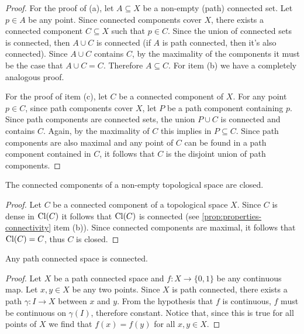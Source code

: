 \begin{proof}
    For the proof of (a), let \(A \subseteq X\) be a non-empty (path) connected
    set. Let \(p \in A\) be any point. Since connected components cover \(X\), there
    exists a connected component \(C \subseteq X\) such that \(p \in C\). Since the
    union of connected sets is connected, then \(A \cup C\) is connected (if \(A\)
    is path connected, then it's also connected). Since \(A \cup C\) contains \(C\),
    by the maximality of the components it must be the case that \(A \cup C =
    C\). Therefore \(A \subseteq C\). For item (b) we have a completely analogous
    proof.

    For the proof of item (c), let \(C\) be a connected component of \(X\). For any
    point \(p \in C\), since path components cover \(X\), let \(P\) be a path
    component containing \(p\). Since path components are connected sets, the union
    \(P \cup C\) is connected and contains \(C\). Again, by the maximality of \(C\)
    this implies in \(P \subseteq C\). Since path components are also maximal and
    any point of \(C\) can be found in a path component contained in \(C\), it
    follows that \(C\) is the disjoint union of path components.
\end{proof}

\begin{lemma}
    \label{lem:conn-comp-are-closed}
    The connected components of a non-empty topological space are closed.
\end{lemma}

\begin{proof}
    Let \(C\) be a connected component of a topological space \(X\). Since \(C\) is
    dense in \(\operatorname{Cl}(C)\) it follows that \(\operatorname{Cl}(C)\) is connected (see
    \cref{prop:properties-connectivity} item (b)). Since connected components are
    maximal, it follows that \(\operatorname{Cl}(C) = C\), thus \(C\) is closed.
\end{proof}

\begin{proposition}
    \label{prop:path-connected-is-connected}
    Any path connected space is connected.
\end{proposition}

\begin{proof}
    Let \(X\) be a path connected space and \(f: X \to \{0, 1\}\) be any continuous
    map. Let \(x, y \in X\) be any two points. Since \(X\) is path connected, there
    exists a path \(\gamma: I \to X\) between \(x\) and \(y\). From the hypothesis
    that \(f\) is continuous, \(f\) must be continuous on \(\gamma(I)\), therefore
    constant. Notice that, since this is true for all points of \(X\) we find that
    \(f(x) = f(y)\) for all \(x, y \in X\).
\end{proof}

